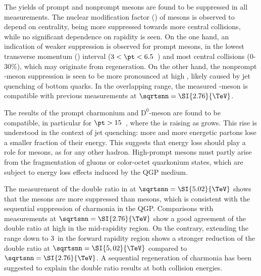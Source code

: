 The yields of prompt and nonprompt \JPsi mesons are found to be suppressed in all measurements. The nuclear modification factor (\raa) of \JPsi mesons is observed to depend on centrality, being more suppressed towards more central collisions, while no significant dependence on rapidity is seen. On the one hand, an indication of weaker suppression is observed for prompt \JPsi mesons, in the lowest transverse momentum (\pt) interval ($3 < \pt < 6.5$~\GeVc) and most central collisions (0-30\%), which may originate from \JPsi regeneration. On the other hand, the nonprompt \JPsi-meson suppression is seen to be more pronounced at high \pt, likely caused by jet quenching of bottom quarks. In the overlapping range, the measured \JPsi-meson \raa is compatible with previous measurements at $\sqrtsnn = \SI{2.76}{\TeV}$.

The results of the prompt charmonium and $\text{D}^{0}$-meson \raa are found to be compatible, in particular for $\pt > 15$~\GeVc, where the \raa is raising as \pt grows. This rise is understood in the context of jet quenching: more and more energetic partons lose a smaller fraction of their energy. This suggests that energy loss should play a role for \JPsi mesons, as for any other hadron. High-\pt prompt \JPsi mesons must partly arise from the fragmentation of gluons or color-octet quarkonium states, which are subject to energy loss effects induced by the QGP medium.

The measurement of the \doubleRatio double ratio in \RunPbPb at $\sqrtsnn = \SI{5.02}{\TeV}$ shows that the \PsiP mesons are more suppressed than \JPsi mesons, which is consistent with the sequential suppression of charmonia in the QGP. Comparisons with measurements at $\sqrtsnn = \SI{2.76}{\TeV}$ show a good agreement of the double ratio at high \pt in the mid-rapidity region. On the contrary, extending the \pt range down to 3~\GeVc in the forward rapidity region shows a stronger reduction of the double ratio at $\sqrtsnn = \SI{5,02}{\TeV}$ compared to $\sqrtsnn = \SI{2.76}{\TeV}$. A sequential regeneration of charmonia has been suggested to explain the double ratio results at both collision energies.